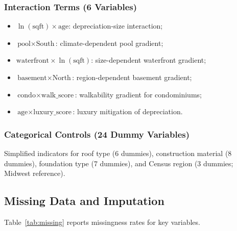 \subsubsection{Interaction Terms (6 Variables)}

\begin{itemize}[nosep]
    \item $\ln(\text{sqft}) \times \text{age}$: depreciation-size interaction;
    \item $\text{pool} \times \text{South}$: climate-dependent pool gradient;
    \item $\text{waterfront} \times \ln(\text{sqft})$: size-dependent waterfront gradient;
    \item $\text{basement} \times \text{North}$: region-dependent basement gradient;
    \item $\text{condo} \times \text{walk\_score}$: walkability gradient for condominiums;
    \item $\text{age} \times \text{luxury\_score}$: luxury mitigation of depreciation.
\end{itemize}

\subsubsection{Categorical Controls (24 Dummy Variables)}

Simplified indicators for roof type (6 dummies), construction material (8 dummies), foundation type (7 dummies), and Census region (3 dummies; Midwest reference).

\subsection{Missing Data and Imputation}

Table~\ref{tab:missing} reports missingness rates for key variables.

